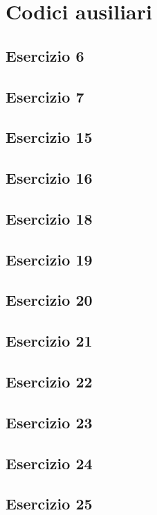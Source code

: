 \section{Codici ausiliari}

\subsection{Esercizio 6}


\subsection{Esercizio 7}


\subsection{Esercizio 15}


\subsection{Esercizio 16}


\subsection{Esercizio 18}


\subsection{Esercizio 19}


\subsection{Esercizio 20}


\subsection{Esercizio 21}


\subsection{Esercizio 22}


\subsection{Esercizio 23}


\subsection{Esercizio 24}


\subsection{Esercizio 25}

